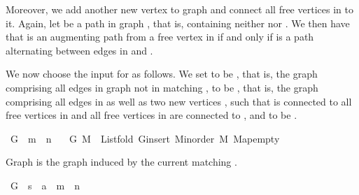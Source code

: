 \begin{isabellebody}
\begin{isamarkuptext}
Moreover, we add another new vertex  to graph  and connect all free vertices in
 to it. Again, let  be a path in graph , that is, containing neither
 nor . We then have that  is an augmenting path from a free vertex in
 if and only if  is a path alternating between edges in  and
.

We now choose the input for  as follows. We set  to be , that
is, the graph comprising all edges in graph  not in matching ,  to be
, that is, the graph comprising all edges in  as well as two new vertices
,  such that  is connected to all free vertices in  and all free
vertices in  are connected to , and  to be .%
\end{isamarkuptext}\isamarkuptrue%
\isamarkupfalse%
\ G{}{\isacharunderscore}{\kern0pt}{}\ {\isacharcolon}{\kern0pt}{\isacharcolon}{\kern0pt}\ {\isachardoublequoteopen}{\isacharprime}{\kern0pt}m\ {\isasymRightarrow}\ {\isacharprime}{\kern0pt}n{\isachardoublequoteclose}\ \isanewline
\ \ {\isachardoublequoteopen}G{}{\isacharunderscore}{\kern0pt}{}\ M\ {\isasymequiv}\ List{\isachardot}{\kern0pt}fold\ G{\isachardot}{\kern0pt}insert\ {\isacharparenleft}{\kern0pt}M{\isacharunderscore}{\kern0pt}inorder\ M{\isacharparenright}{\kern0pt}\ Map{\isacharunderscore}{\kern0pt}empty{\isachardoublequoteclose}%
\begin{isamarkuptext}%
Graph  is the graph induced by the current matching .%
\end{isamarkuptext}\isamarkuptrue%
\isamarkupfalse%
\ G{}{\isacharunderscore}{\kern0pt}{}\ {\isacharcolon}{\kern0pt}{\isacharcolon}{\kern0pt}\ {\isachardoublequoteopen}{\isacharprime}{\kern0pt}s\ {\isasymRightarrow}\ {\isacharprime}{\kern0pt}a\ {\isasymRightarrow}\ {\isacharprime}{\kern0pt}m\ {\isasymRightarrow}\ {\isacharprime}{\kern0pt}n{\isachardoublequoteclose}\ \isanewline

\end{isabellebody}
